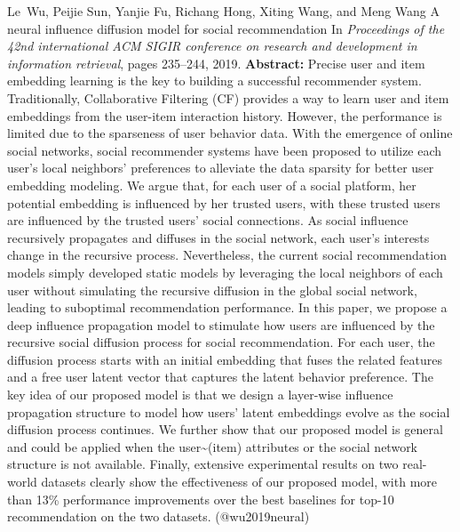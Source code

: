 \documentclass{article}
\begin{document}
\begin{thebibliography}{}
 Le~Wu, Peijie Sun, Yanjie Fu, Richang Hong, Xiting Wang, and Meng Wang \newblock A neural influence diffusion model for social recommendation \newblock In {\em Proceedings of the 42nd international ACM SIGIR conference on research and development in information retrieval}, pages 235--244, 2019. \newblock \textbf{Abstract:} Precise user and item embedding learning is the key to building a successful recommender system. Traditionally, Collaborative Filtering (CF) provides a way to learn user and item embeddings from the user-item interaction history. However, the performance is limited due to the sparseness of user behavior data. With the emergence of online social networks, social recommender systems have been proposed to utilize each user's local neighbors' preferences to alleviate the data sparsity for better user embedding modeling. We argue that, for each user of a social platform, her potential embedding is influenced by her trusted users, with these trusted users are influenced by the trusted users' social connections. As social influence recursively propagates and diffuses in the social network, each user's interests change in the recursive process. Nevertheless, the current social recommendation models simply developed static models by leveraging the local neighbors of each user without simulating the recursive diffusion in the global social network, leading to suboptimal recommendation performance. In this paper, we propose a deep influence propagation model to stimulate how users are influenced by the recursive social diffusion process for social recommendation. For each user, the diffusion process starts with an initial embedding that fuses the related features and a free user latent vector that captures the latent behavior preference. The key idea of our proposed model is that we design a layer-wise influence propagation structure to model how users' latent embeddings evolve as the social diffusion process continues. We further show that our proposed model is general and could be applied when the user\textasciitilde{}(item) attributes or the social network structure is not available. Finally, extensive experimental results on two real-world datasets clearly show the effectiveness of our proposed model, with more than 13\% performance improvements over the best baselines for top-10 recommendation on the two datasets. \newblock (@wu2019neural)


\end{thebibliography}
\end{document}
